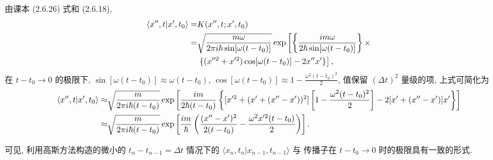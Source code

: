 \documentclass{assignment}
\begin{document}
\begin{sol}
\begin{itemize}
        由课本 (2.6.26) 式和 (2.6.18),
        \begin{align}
            \notag\langle x'',t\vert x',t_0\rangle=&K(x'',t;x',t_0)\\
            \notag=&\sqrt{\frac{m\omega}{2\pi i\hbar\sin[\omega(t-t_0)]}}\exp\left[\left\{\frac{im\omega}{2\hbar\sin[\omega(t-t_0)]}\right\}\times\right.\\
            &\left.\{(x''^2+x'^2)\cos[\omega(t-t_0)]-2x''x'\}\right],
        \end{align}
        在 $t-t_0\rightarrow 0$ 的极限下, $\sin[\omega(t-t_0)]\approx\omega(t-t_0)$, $\cos[\omega(t-t_0)]\approx 1-\frac{\omega^2(t-t_0)^2}{2}$, 值保留 $(\Delta t)^2$ 量级的项, 上式可简化为
        {\small
        \begin{align}
            \notag\langle x'',t\vert x',t_0\rangle\approx&\sqrt{\frac{m}{2\pi i\hbar(t-t_0)}}\exp\left[\frac{im}{2\hbar(t-t_0)}\left\{[x'^2+(x'+(x''-x'))^2]\left[1-\frac{\omega^2(t-t_0)^2}{2}\right]-2[x'+(x''-x')]x'\right\}\right]\\
            \approx&\sqrt{\frac{m}{2\pi i\hbar(t-t_0)}}\exp\left[\frac{im}{\hbar}\left(\frac{(x''-x')^2}{2(t-t_0)}-\frac{\omega^2x'^2(t-t_0)}{2}\right)\right].
        \end{align}
        }

        可见, 利用高斯方法构造的微小的 $t_n-t_{n-1}=\Delta t$ 情况下的 $\langle x_n,t_n\vert x_{n-1},t_{n-1}\rangle$ 与 传播子在 $t-t_0\rightarrow 0$ 时的极限具有一致的形式.
    \end{itemize}
\end{sol}
\end{document}
